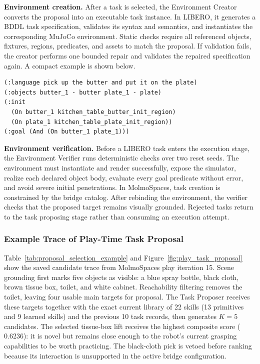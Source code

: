 \textbf{Environment creation.}
After a task is selected, the Environment Creator converts the proposal into an
executable task instance. In LIBERO, it generates a BDDL task specification,
validates its syntax and semantics, and instantiates the corresponding MuJoCo
environment. Static checks require all referenced objects, fixtures, regions,
predicates, and assets to match the proposal. If validation fails, the creator
performs one bounded repair and validates the repaired specification again. A
compact example is shown below.

\begin{verbatim}
(:language pick up the butter and put it on the plate)
(:objects butter_1 - butter plate_1 - plate)
(:init
  (On butter_1 kitchen_table_butter_init_region)
  (On plate_1 kitchen_table_plate_init_region))
(:goal (And (On butter_1 plate_1)))
\end{verbatim}

\textbf{Environment verification.}
Before a LIBERO task enters the execution stage, the Environment Verifier runs
deterministic checks over two reset seeds. The environment must instantiate and
render successfully, expose the simulator, realize each declared object body,
evaluate every goal predicate without error, and avoid severe initial
penetrations. In MolmoSpaces, task creation is constrained by the bridge
catalog. After rebinding the environment, the verifier checks that the proposed
target remains visually grounded. Rejected tasks return to the task proposing stage
rather than consuming an execution attempt.

\subsubsection{Example Trace of Play-Time Task Proposal}
Table~\ref{tab:proposal_selection_example} and Figure~\ref{fig:play_task_proposal} show the saved candidate trace from
MolmoSpaces play iteration 15. Scene grounding first marks five objects as
visible: a blue spray bottle, black cloth, brown tissue box, toilet, and white
cabinet. Reachability filtering removes the toilet, leaving four usable
main targets for proposal. The Task Proposer receives these targets together
with the exact current library of 22 skills (13 primitives and 9 learned
skills) and the previous 10 task records, then generates $K=5$ candidates. The
selected tissue-box lift receives the highest composite score ($0.6236$): it is
novel but remains close enough to the robot's current grasping capabilities to
be worth practicing. The black-cloth pick is vetoed before ranking because its
interaction is unsupported in the active bridge configuration.

